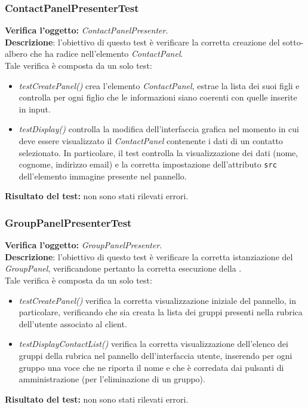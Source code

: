 \subsubsection{ContactPanelPresenterTest}
\textbf{Verifica l'oggetto:} \textit{ContactPanelPresenter}.\\
\textbf{Descrizione}: l'obiettivo di questo test è verificare la corretta creazione del sotto-albero che ha radice nell'elemento \textit{ContactPanel}.\\
Tale verifica è composta da un solo test:
\begin{itemize}
\item \textit{testCreatePanel()} crea l'elemento \textit{ContactPanel}, estrae la lista dei suoi figli e controlla per ogni figlio che le informazioni siano coerenti con quelle inserite in input.
\item \textit{testDisplay()} controlla la modifica dell'interfaccia grafica nel momento in cui deve essere visualizzato il \textit{ContactPanel} contenente i dati di un contatto selezionato. In particolare, il test controlla la visualizzazione dei dati (nome, cognome, indirizzo email) e la corretta impostazione dell'attributo \texttt{src} dell'elemento immagine presente nel pannello.
\end{itemize}
\textbf{Risultato del test:} non sono stati rilevati errori.

\subsubsection{GroupPanelPresenterTest}
\textbf{Verifica l'oggetto:} \textit{GroupPanelPresenter}.\\
\textbf{Descrizione}: l'obiettivo di questo test è verificare la corretta istanziazione del \textit{GroupPanel}, verificandone pertanto la corretta esecuzione della .\\
Tale verifica è composta da un solo test:
\begin{itemize}
\item \textit{testCreatePanel()} verifica la corretta visualizzazione iniziale del pannello, in particolare, verificando che sia creata la lista dei gruppi presenti nella rubrica dell'utente associato al client.
\item \textit{testDisplayContactList()} verifica la corretta visualizzazione dell'elenco dei gruppi della rubrica nel pannello dell'interfaccia utente, inserendo per ogni gruppo una voce che ne riporta il nome e che è corredata dai pulsanti di amministrazione (per l'eliminazione di un gruppo).
\end{itemize}
\textbf{Risultato del test:} non sono stati rilevati errori.

